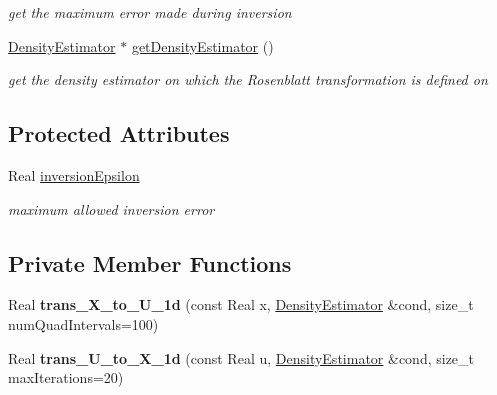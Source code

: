 \begin{DoxyCompactItemize}
\begin{DoxyCompactList}\small\item\em get the maximum error made during inversion \end{DoxyCompactList}\item 
\hyperlink{classPecos_1_1DensityEstimator}{Density\+Estimator} $\ast$ \hyperlink{classPecos_1_1RosenblattTransformation_aef489249e6eda746aed7e65a5be6a4de}{get\+Density\+Estimator} ()\label{classPecos_1_1RosenblattTransformation_aef489249e6eda746aed7e65a5be6a4de}

\begin{DoxyCompactList}\small\item\em get the density estimator on which the Rosenblatt transformation is defined on \end{DoxyCompactList}\end{DoxyCompactItemize}
\subsection*{Protected Attributes}
\begin{DoxyCompactItemize}
\item 
Real \hyperlink{classPecos_1_1RosenblattTransformation_a803a519b867adc021482ed6761df60e8}{inversion\+Epsilon}\label{classPecos_1_1RosenblattTransformation_a803a519b867adc021482ed6761df60e8}

\begin{DoxyCompactList}\small\item\em maximum allowed inversion error \end{DoxyCompactList}\end{DoxyCompactItemize}
\subsection*{Private Member Functions}
\begin{DoxyCompactItemize}
\item 
Real {\bfseries trans\+\_\+\+X\+\_\+to\+\_\+\+U\+\_\+1d} (const Real x, \hyperlink{classPecos_1_1DensityEstimator}{Density\+Estimator} \&cond, size\+\_\+t num\+Quad\+Intervals=100)\label{classPecos_1_1RosenblattTransformation_a9c79289baf0959bfc7cc8115d05ff6f2}

\item 
Real {\bfseries trans\+\_\+\+U\+\_\+to\+\_\+\+X\+\_\+1d} (const Real u, \hyperlink{classPecos_1_1DensityEstimator}{Density\+Estimator} \&cond, size\+\_\+t max\+Iterations=20)\label{classPecos_1_1RosenblattTransformation_a84c38f5fef6fa6fee22718d424e17d25}

\end{DoxyCompactItemize}
